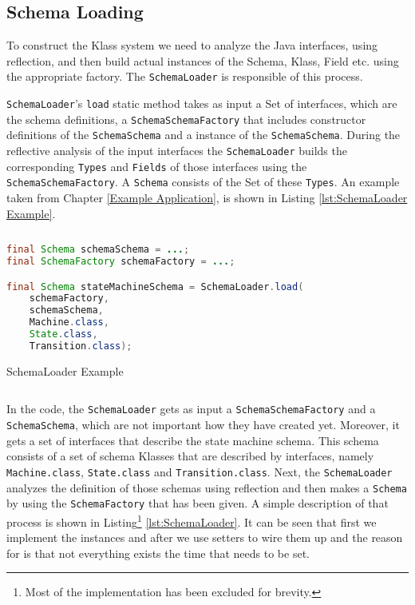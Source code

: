\subsection{Schema Loading}\label{sec:Schema Loading}
To construct the Klass system we need to analyze the Java interfaces, using reflection, and then build actual instances of the Schema, Klass, Field etc. using the appropriate factory.
The \texttt{SchemaLoader} is responsible of this process.

\texttt{SchemaLoader}'s \texttt{load} static method takes as input a Set of interfaces, which are the schema definitions, a \texttt{SchemaSchemaFactory} that includes constructor definitions of the \texttt{SchemaSchema} and a instance of the \texttt{SchemaSchema}.
During the reflective analysis of the input interfaces the \texttt{SchemaLoader} builds the corresponding \texttt{Types} and \texttt{Fields} of those interfaces using the \texttt{SchemaSchemaFactory}.
A \texttt{Schema} consists of the Set of these \texttt{Types}.
An example taken from Chapter \ref{Example Application}, is shown in Listing \ref{lst:SchemaLoader Example}.

\begin{sourcecode} [H]
	\begin{lstlisting}[language=Java, escapechar=|]
final Schema schemaSchema = ...;
final SchemaFactory schemaFactory = ...;

final Schema stateMachineSchema = SchemaLoader.load(
	schemaFactory, 
	schemaSchema, 
	Machine.class, 
	State.class, 
	Transition.class);
	\end{lstlisting}
	\caption{SchemaLoader Example}
	\label{lst:SchemaLoader Example}
\end{sourcecode}

In the code, the \texttt{SchemaLoader} gets as input a \texttt{SchemaSchemaFactory} and a \texttt{SchemaSchema}, which are not important how they have created yet.
Moreover, it gets a set of interfaces that describe the state machine schema.
This schema consists of a set of schema Klasses that are described by interfaces, namely \texttt{Machine.class}, \texttt{State.class} and \texttt{Transition.class}.
Next, the \texttt{SchemaLoader} analyzes the definition of those schemas using reflection and then makes a \texttt{Schema} by using the \texttt{SchemaFactory} that has been given.
A simple description of that process is shown in Listing\footnote{
	Most of the implementation has been excluded for brevity.} \ref{lst:SchemaLoader}.
It can be seen that first we implement the instances and after we use setters to wire them up and the reason for is that not everything exists the time that needs to be set.

